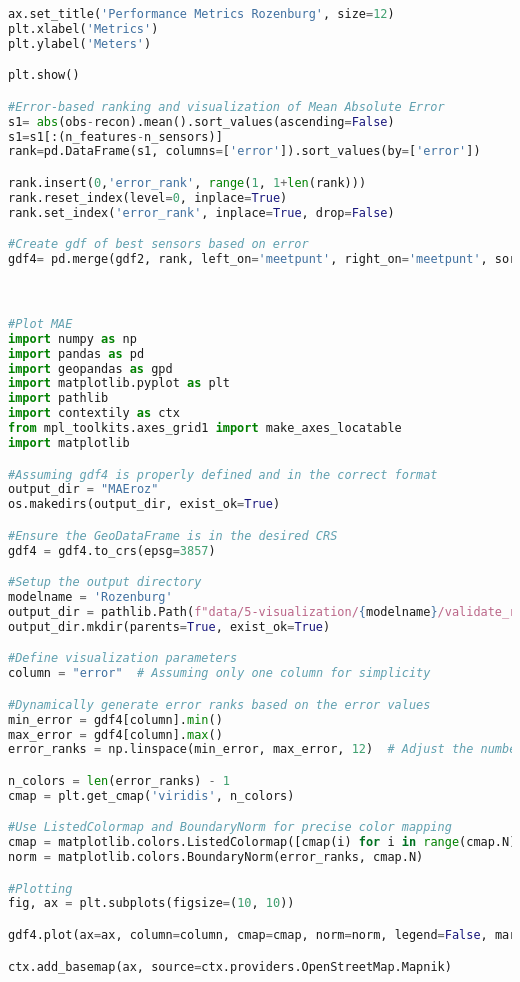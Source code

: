 \begin{lstlisting}[language=Python]
ax.set_title('Performance Metrics Rozenburg', size=12)
plt.xlabel('Metrics')
plt.ylabel('Meters')

plt.show()

#Error-based ranking and visualization of Mean Absolute Error
s1= abs(obs-recon).mean().sort_values(ascending=False)
s1=s1[:(n_features-n_sensors)]
rank=pd.DataFrame(s1, columns=['error']).sort_values(by=['error'])

rank.insert(0,'error_rank', range(1, 1+len(rank)))
rank.reset_index(level=0, inplace=True)
rank.set_index('error_rank', inplace=True, drop=False)

#Create gdf of best sensors based on error
gdf4= pd.merge(gdf2, rank, left_on='meetpunt', right_on='meetpunt', sort=False, how='right').to_crs(epsg=28992)



#Plot MAE
import numpy as np
import pandas as pd
import geopandas as gpd
import matplotlib.pyplot as plt
import pathlib
import contextily as ctx
from mpl_toolkits.axes_grid1 import make_axes_locatable
import matplotlib

#Assuming gdf4 is properly defined and in the correct format
output_dir = "MAEroz"
os.makedirs(output_dir, exist_ok=True)

#Ensure the GeoDataFrame is in the desired CRS
gdf4 = gdf4.to_crs(epsg=3857)

#Setup the output directory
modelname = 'Rozenburg'
output_dir = pathlib.Path(f"data/5-visualization/{modelname}/validate_ranks")
output_dir.mkdir(parents=True, exist_ok=True)

#Define visualization parameters
column = "error"  # Assuming only one column for simplicity

#Dynamically generate error ranks based on the error values
min_error = gdf4[column].min()
max_error = gdf4[column].max()
error_ranks = np.linspace(min_error, max_error, 12)  # Adjust the number of ranks as needed

n_colors = len(error_ranks) - 1
cmap = plt.get_cmap('viridis', n_colors)

#Use ListedColormap and BoundaryNorm for precise color mapping
cmap = matplotlib.colors.ListedColormap([cmap(i) for i in range(cmap.N)][:n_colors])
norm = matplotlib.colors.BoundaryNorm(error_ranks, cmap.N)

#Plotting
fig, ax = plt.subplots(figsize=(10, 10))

gdf4.plot(ax=ax, column=column, cmap=cmap, norm=norm, legend=False, markersize=60)

ctx.add_basemap(ax, source=ctx.providers.OpenStreetMap.Mapnik)


\end{lstlisting}
